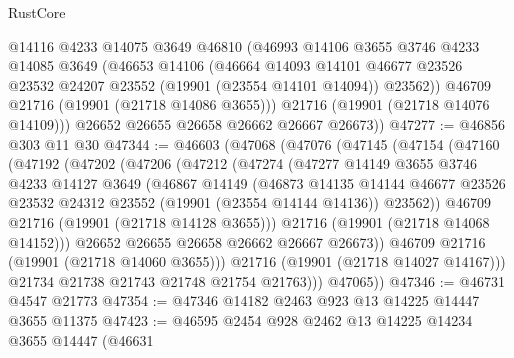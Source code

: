 \begin{lexlean}{RustCore}
\begin{coremodule}
          @14116
          @4233
          @14075
          @3649
          @46810
          (@46993
            @14106
            @3655
            @3746
            @4233
            @14085
            @3649
            (@46653
              @14106
              (@46664
                @14093
                @14101
                @46677
                @23526
                @23532
                @24207
                @23552
                (@19901 (@23554 @14101 @14094))
                @23562))
            @46709
            @21716
            (@19901 (@21718 @14086 @3655)))
          @21716
          (@19901 (@21718 @14076 @14109)))
        @26652
        @26655
        @26658
        @26662
        @26667
        @26673))
@47277 := @46856 @303 @11 @30
@47344 := @46603
    (@47068
      (@47076
        (@47145
          (@47154
            (@47160
              (@47192
                (@47202
                  (@47206
                    (@47212
                      (@47274
                        (@47277
                          @14149
                          @3655
                          @3746
                          @4233
                          @14127
                          @3649
                          (@46867
                            @14149
                            (@46873
                              @14135
                              @14144
                              @46677
                              @23526
                              @23532
                              @24312
                              @23552
                              (@19901 (@23554 @14144 @14136))
                              @23562))
                          @46709
                          @21716
                          (@19901 (@21718 @14128 @3655)))
                        @21716
                        (@19901 (@21718 @14068 @14152)))
                      @26652
                      @26655
                      @26658
                      @26662
                      @26667
                      @26673))
                  @46709
                  @21716
                  (@19901 (@21718 @14060 @3655)))
                @21716
                (@19901 (@21718 @14027 @14167)))
              @21734
              @21738
              @21743
              @21748
              @21754
              @21763)))
        @47065))
@47346 := @46731 @4547 @21773
@47354 := @47346 @14182 @2463 @923 @13 @14225 @14447 @3655 @11375
@47423 := @46595
    @2454
    @928
    @2462
    @13
    @14225
    @14234
    @3655
    @14447
    (@46631

\end{coremodule}
\end{lexlean}
